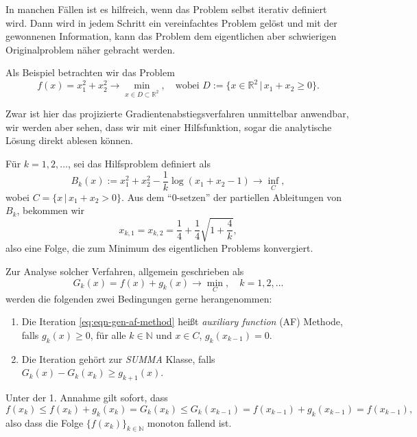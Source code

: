 \documentclass[
]{book}
\theoremstyle{definition}
\theoremstyle{definition}
\theoremstyle{definition}
\theoremstyle{definition}
\theoremstyle{remark}
\begin{document}
In manchen Fällen ist es hilfreich, wenn das Problem selbst iterativ definiert wird.
Dann wird in jedem Schritt ein vereinfachtes Problem gelöst und mit der gewonnenen Information, kann das Problem dem eigentlichen aber schwierigen Originalproblem näher gebracht werden.

Als Beispiel betrachten wir das Problem
\begin{equation}
f(x)=x_1^2+x_2^2 \to \min_{x\in D\subset \mathbb R^{2}}, \quad \text{wobei }D:=\{x\in \mathbb R^{2}\,|\, x_1+x_2 \geq 0\}.
\label{eq:eqn-exa-cnstrnt-optiprob}
\end{equation}

Zwar ist hier das projizierte Gradientenabstiegsverfahren unmittelbar anwendbar, wir werden aber sehen, dass wir mit einer Hilfsfunktion, sogar die analytische Lösung direkt ablesen können.

Für \(k=1,2,\dotsc\), sei das Hilfsproblem definiert als
\begin{equation}
B_k(x):=x_1^2+x_2^2 - \frac{1}{k}\log(x_1+x_2-1)\to \inf_C,
\label{eq:eqn-exa-relaxed-optiprob}
\end{equation}
wobei \(C=\{x\,|\,x_1+x_2>0\}\). Aus dem ``0-setzen'' der partiellen Ableitungen von \(B_k\), bekommen wir
\begin{equation*}
x_{k,1}=x_{k,2} = \frac 14 + \frac 14 \sqrt{1 + \frac 4k},
\end{equation*}
also eine Folge, die zum Minimum des eigentlichen Problems konvergiert.

Zur Analyse solcher Verfahren, allgemein geschrieben als
\begin{equation}
G_k(x) = f(x) + g_k(x) \to \min_C, \quad k=1,2,\dotsc
\label{eq:eqn-gen-af-method}
\end{equation}
werden die folgenden zwei Bedingungen gerne herangenommen:

\begin{enumerate}
\def\labelenumi{\arabic{enumi}.}
\item
  Die Iteration \eqref{eq:eqn-gen-af-method} heißt \emph{auxiliary function} (AF) Methode, falls \(g_k(x)\geq 0\), für alle \(k\in \mathbb N\) und \(x\in C\), \(g_k(x_{k-1})=0\).
\item
  Die Iteration gehört zur \emph{SUMMA} Klasse, falls \(G_k(x)-G_k(x_k) \geq g_{k+1}(x)\).
\end{enumerate}

Unter der 1. Annahme gilt sofort, dass
\begin{equation*}
f(x_{k}) \leq f(x_{k}) + g_k(x_k) = G_k(x_k) \leq G_k(x_{k-1}) = f(x_{k-1}) + g_k(x_{k-1}) = f(x_{k-1}),
\end{equation*}
also dass die Folge \(\{f(x_k)\}_{k\in \mathbb N}\) monoton fallend ist.
\end{document}
